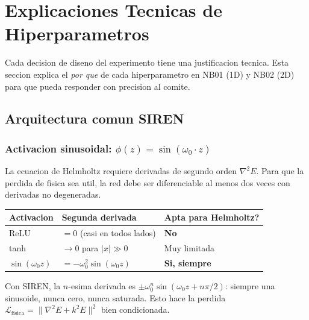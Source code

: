 \section{Explicaciones Tecnicas de Hiperparametros}

\begin{tcolorbox}[colback=ujatblue!10, colframe=ujatblue,
  title={\bfseries Proposito de esta seccion}, coltitle=white]
Cada decision de diseno del experimento tiene una justificacion tecnica.
Esta seccion explica el \emph{por que} de cada hiperparametro en NB01 (1D)
y NB02 (2D) para que pueda responder con precision al comite.
\end{tcolorbox}

\vspace{8pt}

\subsection{Arquitectura comun SIREN}

\subsubsection*{Activacion sinusoidal: $\phi(z) = \sin(\omega_0 \cdot z)$}

\begin{tcolorbox}[colback=gray!5, colframe=ujatgray, breakable]
La ecuacion de Helmholtz requiere derivadas de segundo orden $\nabla^2 E$.
Para que la perdida de fisica sea util, la red debe ser diferenciable al menos
dos veces con derivadas no degeneradas.

\begin{tabular}{@{}lll@{}}
\toprule
\textbf{Activacion} & \textbf{Segunda derivada} & \textbf{Apta para Helmholtz?} \\
\midrule
ReLU & $= 0$ (casi en todos lados) & \textbf{No} \\
tanh & $\to 0$ para $|x| \gg 0$ & Muy limitada \\
$\sin(\omega_0 z)$ & $= -\omega_0^2 \sin(\omega_0 z)$ & \textbf{Si, siempre} \\
\bottomrule
\end{tabular}

\vspace{4pt}
Con SIREN, la $n$-esima derivada es $\pm \omega_0^n \sin(\omega_0 z + n\pi/2)$:
siempre una sinusoide, nunca cero, nunca saturada. Esto hace la perdida
$\mathcal{L}_\text{fisica} = \|\nabla^2 E + k^2 E\|^2$ bien condicionada.
\end{tcolorbox}

